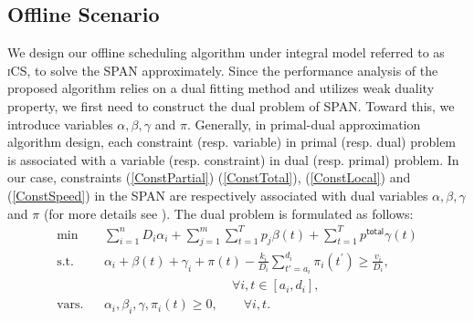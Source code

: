 \documentclass[journal]{IEEEtran}
\newcommand{\revv}[1]{{\color{black}#1}}%
\newcommand{\ics}{\textsc{iCS}\xspace}
\newcommand{\MCSP}{\textsf{SPAN}\xspace}
\newcommand{\bee}{\begin{eqnarray}}
\newcommand{\eee}{\end{eqnarray}}
\newcommand{\bse}{\begin{subequations}}
\newcommand{\ese}{\end{subequations}}
\begin{document}
		
		\subsection{Offline Scenario}   
		\label{subsec:icsalgorithm}
		We design our offline scheduling algorithm under integral model referred to as \ics, to solve the \MCSP approximately. 
Since the performance analysis of the proposed algorithm relies on a dual fitting method and utilizes weak duality property, \revv{we first need to construct the dual problem of \MCSP. Toward this, we introduce variables $\alpha, \beta, \gamma$ and $\pi$. Generally, in primal-dual approximation algorithm design, each constraint (resp. variable) in primal (resp. dual) problem is associated with a variable (resp. constraint) in dual (resp. primal) problem. In our case, constraints (\ref{ConstPartial}) (\ref{ConstTotal}), (\ref{ConstLocal}) and (\ref{ConstSpeed}) in the \MCSP are respectively associated with dual variables $\alpha, \beta, \gamma$ and $\pi$ (for more details see \cite{approx}). The dual problem is formulated as follows:}
		\bse
		\bee
		\min &&\sum_{i=1}^n D_i\alpha _i + \sum_{j=1}^m \sum_{t=1}^T p_j\beta (t)+\sum_{t=1}^T p^\mathsf{total}\gamma (t)\nonumber\\ 
		\textrm{s.t.} && \alpha _i+\beta (t) +\gamma _i + \pi (t)- \frac{k_i}{D_i}\sum_{t'=a_i}^{d_i} \pi _i(t^\prime) \geq \frac{v_{i}}{D_i},\label{ConstDcover} \nonumber\\
		&& \quad\quad\quad\quad\quad\quad\quad\quad\quad\quad\forall i, t\in [a_i, d_i],\\
		\textrm{vars.}&&\alpha _i, \beta _i, \gamma,  \pi _i(t)\geq 0,\quad\quad\forall i,t. \nonumber
		\eee
		\ese
\end{document}
